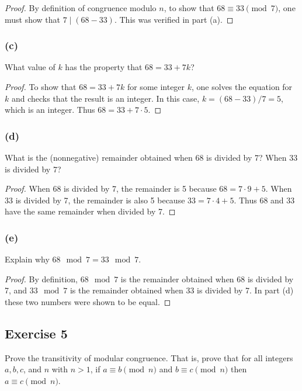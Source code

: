 \documentclass[14pt]{extarticle}
\begin{document}
\begin{proof}
By definition of congruence modulo \(n\), to show that \(68 \equiv 33 \pmod 7\), one must show that \(7 \mid (68-33)\). 
This was verified in part (a).
\end{proof}

\subsubsection{(c)}
What value of $k$ has the property that \(68 = 33 + 7k\)?

\begin{proof}
To show that \(68 = 33 + 7k\) for some integer \(k\), one solves the equation for \(k\) and checks that the result is 
an integer. In this case, \(k = (68 - 33)/7 = 5\), which is an integer. Thus \(68 = 33 + 7 \cdot 5\).
\end{proof}

\subsubsection{(d)}
What is the (nonnegative) remainder obtained when 68 is divided by 7? When 33 is divided by 7?

\begin{proof}
When 68 is divided by 7, the remainder is 5 because \(68 = 7 \cdot 9 + 5\). When 33 is divided by 7, the remainder is 
also 5 because \(33 = 7 \cdot 4 + 5\). Thus 68 and 33 have the same remainder when divided by 7.
\end{proof}

\subsubsection{(e)}
Explain why \(68 \mod 7 = 33 \mod 7\).

\begin{proof}
By definition, \(68 \mod 7\) is the remainder obtained when 68 is divided by 7, and \(33 \mod 7\) is the remainder 
obtained when 33 is divided by 7. In part (d) these two numbers were shown to be equal.
\end{proof}

\subsection{Exercise 5}
Prove the transitivity of modular congruence. That is, prove that for all integers \(a, b, c\), and \(n\) with 
\(n > 1\), if \(a \equiv b \pmod n\) and \(b \equiv c \pmod n\) then \(a \equiv c \pmod n\).
\end{document}
